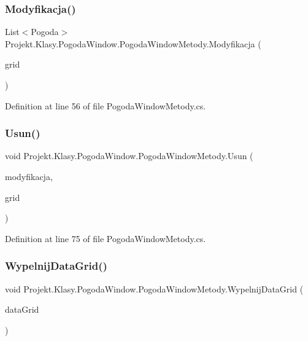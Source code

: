 \subsubsection{\texorpdfstring{Modyfikacja()}{Modyfikacja()}}
{\footnotesize\ttfamily List$<$Pogoda$>$ Projekt.\+Klasy.\+Pogoda\+Window.\+Pogoda\+Window\+Metody.\+Modyfikacja (\begin{DoxyParamCaption}\item[{Data\+Grid}]{grid }\end{DoxyParamCaption})}



Definition at line 56 of file Pogoda\+Window\+Metody.\+cs.

\mbox{\label{class_projekt_1_1_klasy_1_1_pogoda_window_1_1_pogoda_window_metody_ae8f5a295de3223c1ff949760eb1ce36e}} 
\subsubsection{\texorpdfstring{Usun()}{Usun()}}
{\footnotesize\ttfamily void Projekt.\+Klasy.\+Pogoda\+Window.\+Pogoda\+Window\+Metody.\+Usun (\begin{DoxyParamCaption}\item[{List$<$ Pogoda $>$}]{modyfikacja,  }\item[{ref Data\+Grid}]{grid }\end{DoxyParamCaption})}



Definition at line 75 of file Pogoda\+Window\+Metody.\+cs.

\mbox{\label{class_projekt_1_1_klasy_1_1_pogoda_window_1_1_pogoda_window_metody_a650fb8b728ec602d71b1467fe0c78ea2}} 
\subsubsection{\texorpdfstring{WypelnijDataGrid()}{WypelnijDataGrid()}}
{\footnotesize\ttfamily void Projekt.\+Klasy.\+Pogoda\+Window.\+Pogoda\+Window\+Metody.\+Wypelnij\+Data\+Grid (\begin{DoxyParamCaption}\item[{Data\+Grid}]{data\+Grid }\end{DoxyParamCaption})}



